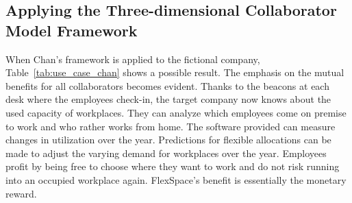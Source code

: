 	\subsection{Applying the Three-dimensional Collaborator Model Framework}
	\vspace{-1em}
			When  Chan's framework is applied to the fictional company, Table~\ref{tab:use_case_chan} shows a possible result. The emphasis on the mutual benefits for all collaborators becomes evident. Thanks to the beacons at each desk where the employees check-in, the target company now knows about the used capacity of workplaces. They can analyze which employees come on premise to work and who rather works from home. The software provided can measure changes in utilization over the year. Predictions for flexible allocations can be made to adjust the varying demand for workplaces over the year. Employees profit by being free to choose where they want to work and do not risk running into an occupied workplace again. FlexSpace's benefit is essentially the monetary reward.
